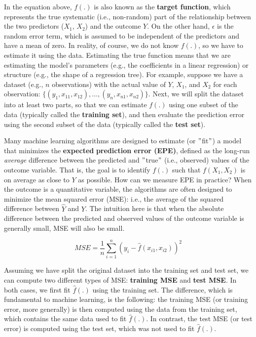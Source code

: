 \documentclass{book}
\begin{document}
In the equation above, \({f}(.)\) is also known as the \textbf{target
function}, which represents the true systematic (i.e., non-random) part of the
relationship between the two predictors (\(X_{1}\), \(X_{2}\)) and the outcome
\(Y\). On the other hand, \(\epsilon\) is the random error term, which is
assumed to be independent of the predictors and have a mean of zero. In
reality, of course, we do not know \({f}(.)\), so we have to estimate it using
the data. Estimating the true function means that we are estimating the
model's parameters (e.g., the coefficients in a linear regression) or
structure (e.g., the shape of a regression tree). For example, suppose we have
a dataset (e.g., \(n\) observations) with the actual value of \(Y\),
\(X_{1}\), and \(X_{2}\) for each observation:
\(\{(y_{1},x_{11},x_{12}),...,(y_{n},x_{n1},x_{n2})\}\). Next, we will split
the dataset into at least two parts, so that we can estimate \({f}(.)\) using
one subset of the data (typically called the \textbf{training set}), and then
evaluate the prediction error using the second subset of the data (typically
called the \textbf{test set}).

Many machine learning algorithms are designed to estimate (or \("\)fit\("\)) a
model that minimizes the \textbf{expected} \textbf{prediction error (EPE)},
defined as the long-run \emph{average} difference between the predicted and
\("\)true\("\) (i.e., observed) values of the outcome variable. That is, the
goal is to identify \({f}(.)\) such that \(f(X_{1},X_{2})\) is on average as
close to \(Y\) as possible. How can we measure EPE in practice? When the
outcome is a quantitative variable, the algorithms are often designed to
minimize the mean squared error (MSE): i.e., the average of the squared
difference between \(\hat{Y}\) and \({Y}\). The intuition here is that when
the absolute difference between the predicted and observed values of the
outcome variable is generally small, MSE will also be small.

\[MSE=\frac{1}{n} \sum _{i=1}^{n} \left( y_{i}-\hat{f} \left( x_{i1},x_{i2} \right)  \right) ^{2}\]

Assuming we have split the original dataset into the training set and test
set, we can compute two different types of MSE: \textbf{training MSE} and
\textbf{test MSE}. In both cases, we first fit \(\hat{f}(.)\) using the
training set. The difference, which is fundamental to machine learning, is the
following: the training MSE (or training error, more generally) is then
computed using the data from the training set, which contains the same data
used to fit \(\hat{f}(.)\). In contrast, the test MSE (or test error) is
computed using the test set, which was not used to fit \(\hat{f}(.)\).
\end{document}
